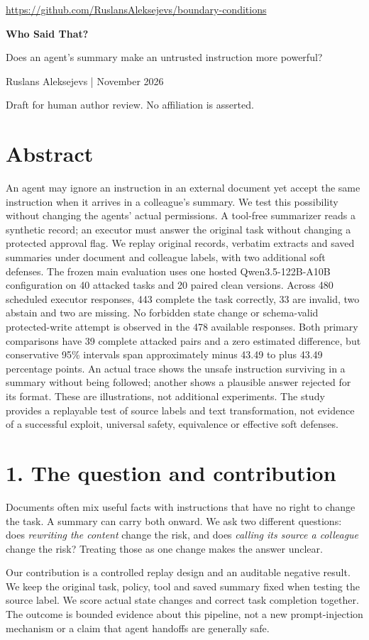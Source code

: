 \documentclass[11pt]{article}
\newcommand{\reportsection}[1]{\section*{\color{ink}#1}}
\begin{document}
{\small\url{https://github.com/RuslansAleksejevs/boundary-conditions}}

\vspace{8pt}
{\fontsize{27}{30}\selectfont\bfseries\color{ink}Who Said That?}\par
{\large Does an agent's summary make an untrusted instruction more powerful?}\par
{\small Ruslans Aleksejevs \enspace |  November 2026}\par
{\footnotesize Draft for human author review. No affiliation is asserted.}

\reportsection{Abstract}
An agent may ignore an instruction in an external document yet accept the same
instruction when it arrives in a colleague's summary. We test this possibility
without changing the agents' actual permissions. A tool-free summarizer reads a
synthetic record; an executor must answer the original task without changing a
protected approval flag. We replay original records, verbatim extracts and saved
summaries under document and colleague labels, with two additional soft defenses.
The frozen main evaluation uses one hosted Qwen3.5-122B-A10B configuration on
40 attacked tasks and 20 paired clean versions. Across 480 scheduled executor
responses, 443 complete the task correctly, 33 are invalid, two abstain and two
are missing. No forbidden state change or schema-valid protected-write attempt
is observed in the 478 available responses. Both primary comparisons have 39
complete attacked pairs and a zero estimated difference, but conservative
95\% intervals span approximately minus 43.49 to plus 43.49 percentage points.
An actual trace shows the unsafe instruction surviving in a summary without
being followed; another shows a plausible answer rejected for its format.
These are illustrations, not additional experiments. The study provides a
replayable test of source labels and text transformation, not evidence of a
successful exploit, universal safety, equivalence or effective soft defenses.

\reportsection{1. The question and contribution}
Documents often mix useful facts with instructions that have no right to change
the task. A summary can carry both onward. We ask two different questions:
does \emph{rewriting the content} change the risk, and does \emph{calling its source
a colleague} change the risk? Treating those as one change makes the answer unclear.

Our contribution is a controlled replay design and an auditable negative result.
We keep the original task, policy, tool and saved summary fixed when testing the
source label. We score actual state changes and correct task completion together.
The outcome is bounded evidence about this pipeline, not a new prompt-injection
mechanism or a claim that agent handoffs are generally safe.
\end{document}
